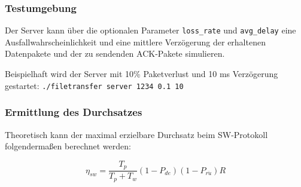 \documentclass{article}
\begin{document}
		\newpage

			\subsubsection{Testumgebung}
			Der Server kann über die optionalen Parameter \texttt{loss\_rate} und \texttt{avg\_delay} eine Ausfallwahrscheinlichkeit und eine mittlere Verzögerung der erhaltenen Datenpakete und der zu sendenden ACK-Pakete simulieren.

			Beispielhaft wird der Server mit 10\% Paketverlust und 10 ms Verzögerung gestartet: \texttt{./filetransfer server 1234 0.1 10}
			

			\subsubsection{Ermittlung des Durchsatzes}
			Theoretisch kann der maximal erzielbare Durchsatz beim SW-Protokoll folgendermaßen berechnet werden:

			\begin{equation*}
				\eta_{sw} = \frac{T_p}{T_p + T_w}(1-P_{de})(1-P_{r\ddot{u}})R
			\end{equation*}
\end{document}
